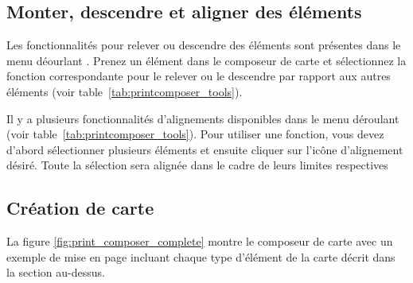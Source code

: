 \subsection{Monter, descendre et aligner des éléments}

Les fonctionnalités pour relever ou descendre des éléments sont présentes dans le menu déourlant . Prenez un élément dans le composeur de carte et sélectionnez la fonction correspondante pour le relever ou le descendre par rapport aux autres éléments (voir table~\ref{tab:printcomposer_tools}).

Il y a plusieurs fonctionnalités d'alignements disponibles dans le menu déroulant\\  (voir table~\ref{tab:printcomposer_tools}). Pour utiliser une fonction, vous devez d'abord sélectionner plusieurs éléments et ensuite cliquer sur l'icône d'alignement désiré. Toute la sélection sera alignée dans le cadre de leurs limites respectives

\subsection{Création de carte}

La figure \ref{fig:print_composer_complete} montre le composeur de carte avec
un exemple de mise en page incluant chaque type d'élément de la carte décrit
dans la section au-dessus.

